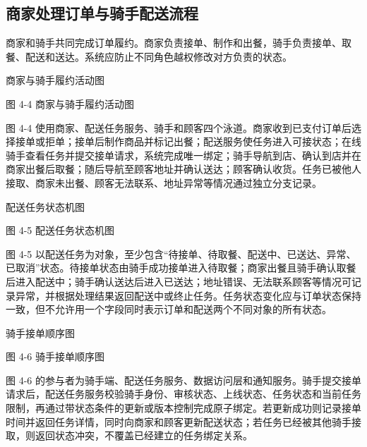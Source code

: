 \subsection{商家处理订单与骑手配送流程}

商家和骑手共同完成订单履约。商家负责接单、制作和出餐，骑手负责接单、取餐、配送和送达。系统应防止不同角色越权修改对方负责的状态。

商家与骑手履约活动图

\begin{center}
\end{center}

图 4-4  商家与骑手履约活动图

图 4-4 使用商家、配送任务服务、骑手和顾客四个泳道。商家收到已支付订单后选择接单或拒单；接单后制作商品并标记出餐；配送服务使任务进入可接状态；在线骑手查看任务并提交接单请求，系统完成唯一绑定；骑手导航到店、确认到店并在商家出餐后取餐；随后导航至顾客地址并确认送达；顾客确认收货。任务已被他人接取、商家未出餐、顾客无法联系、地址异常等情况通过独立分支记录。

配送任务状态机图

\begin{center}
\end{center}

图 4-5  配送任务状态机图

图 4-5 以配送任务为对象，至少包含“待接单、待取餐、配送中、已送达、异常、已取消”状态。待接单状态由骑手成功接单进入待取餐；商家出餐且骑手确认取餐后进入配送中；骑手确认送达后进入已送达；地址错误、无法联系顾客等情况可记录异常，并根据处理结果返回配送中或终止任务。任务状态变化应与订单状态保持一致，但不允许用一个字段同时表示订单和配送两个不同对象的所有状态。

骑手接单顺序图

\begin{center}
\end{center}

图 4-6  骑手接单顺序图

图 4-6 的参与者为骑手端、配送任务服务、数据访问层和通知服务。骑手提交接单请求后，配送任务服务校验骑手身份、审核状态、上线状态、任务状态和当前任务限制，再通过带状态条件的更新或版本控制完成原子绑定。若更新成功则记录接单时间并返回任务详情，同时向商家和顾客更新配送状态；若任务已经被其他骑手接取，则返回状态冲突，不覆盖已经建立的任务绑定关系。

